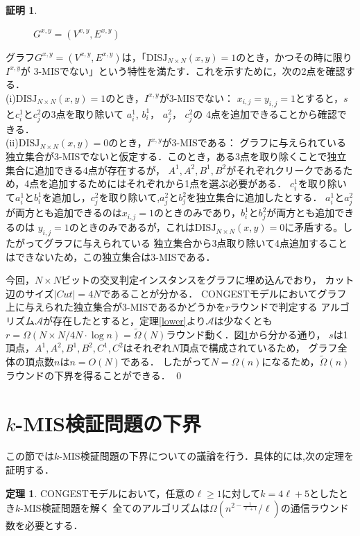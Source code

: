 \documentclass[12pt]{thesis}
\newcommand{\CONGEST}{\textsf{CONGEST}}
\theoremstyle{definition}
\newtheorem{theorem}{定理}[chapter]
\newtheorem*{prf*}{証明}
\begin{document}
\begin{prf*}
\begin{figure}[ht]
\begin{center}
\end{center}
\caption{$G^{x, y} = (V^{x,y}, E^{x,y})$}
\label{3_G(x,y)}
\end{figure}
グラフ$G^{x, y} = (V^{x,y}, E^{x,y})$は，「$\mathrm{DISJ}_{N \times N} (x, y) = 1$のとき，かつその時に限り$I^{x,y}$が
3-MISでない」という特性を満たす．これを示すために，次の2点を確認する． \\
(i)$\mathrm{DISJ}_{N \times N} (x, y) = 1$のとき，$I^{x,y}$が3-MISでない： 
$x_{i, j} = y_{i, j} =1$とすると，$s$と$c_{i}^{1}$と$c_{j}^{2}$の3点を取り除いて
$a_{i}^{1}$, $b_{i}^{1}$， $a_{j}^{2}$， $c_{j}^{2}$の
4点を追加できることから確認できる． \\
(ii)$\mathrm{DISJ}_{N \times N} (x, y) = 0$のとき，$I^{x,y}$が3-MISである： 
グラフに与えられている独立集合が3-MISでないと仮定する．このとき，ある3点を取り除くことで独立集合に追加できる4点が存在するが，
$A^{1}, A^{2}, B^{1}, B^{2}$がそれぞれクリークであるため，4点を追加するためにはそれぞれから1点を選ぶ必要がある．
$c_{i}^{1}$を取り除いて$a_{i}^{1}$と$b_{i}^{1}$を追加し，$c_{j}^{2}$を取り除いて,$a_{j}^{2}$と$b_{j}^{2}$を独立集合に追加したとする．
$a_{i}^{1}$と$a_{j}^{2}$が両方とも追加できるのは$x_{i, j} = 1$のときのみであり，$b_{i}^{1}$と$b_{j}^{2}$が両方とも追加できるのは
$y_{i, j} = 1$のときのみであるが，これは$\mathrm{DISJ}_{N \times N} (x, y) = 0$に矛盾する。したがってグラフに与えられている
独立集合から3点取り除いて4点追加することはできないため，この独立集合は3-MISである．

今回，$N \times N$ビットの交叉判定インスタンスをグラフに埋め込んでおり，
カット辺のサイズ$|\mathit{Cut}| = 4N$であることが分かる．
{\CONGEST}モデルにおいてグラフ上に与えられた独立集合が3-MISであるかどうかを$r$ラウンドで判定する
アルゴリズム$\mathcal{A}$が存在したとすると，定理\ref{lower}より$\mathcal{A}$は少なくとも
$r = \Omega (N \times N/ 4N \cdot \log n) = \tilde{\Omega}(N)$ラウンド動く．図\ref{3_G(x,y)}から分かる通り，
$s$は1頂点，$A^{1}, A^{2}, B^{1}, B^{2}, C^{1}, C^{2}$はそれぞれ$N$頂点で構成されているため，
グラフ全体の頂点数$n$は$n = O(N)$である．
したがって$N = \Omega(n)$になるため，$\tilde{\Omega}(n)$ラウンドの下界を得ることができる． \qed
\end{prf*}
\newpage

\section{$k$-MIS検証問題の下界}
この節では$k$-MIS検証問題の下界についての議論を行う．具体的には,次の定理を証明する．
\begin{theorem}
{\CONGEST}モデルにおいて，任意の$\ell \geq 1$に対して$k = 4\ell + 5$としたとき$k$-MIS検証問題を解く
全てのアルゴリズムは$\Omega\left(n^{2 - \frac{1}{\ell+1}}/\ell \right)$の通信ラウンド数を必要とする．
\end{theorem}
\end{document}
